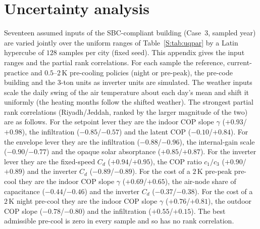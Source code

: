 \documentclass[10pt,a4paper,twocolumn]{article}
\theoremstyle{definition}
\begin{document}
\section{Uncertainty analysis}\label{S:uq}\label{app:S7}
Seventeen assumed inputs of the SBC-compliant building (Case~3, sampled year) are varied jointly over the uniform ranges of Table~\ref{S:tab:uqpar} by a Latin hypercube of $128$ samples per city (fixed seed). This appendix gives the input ranges and the partial rank correlations. For each sample the reference, current-practice and $0.5$--$2\,$K pre-cooling policies (night or pre-peak), the pre-code building and the 3-ton units as inverter units are simulated. The weather inputs scale the daily swing of the air temperature about each day's mean and shift it uniformly (the heating months follow the shifted weather). The strongest partial rank correlations (Riyadh/Jeddah, ranked by the larger magnitude of the two) are as follows. For the setpoint lever they are the indoor COP slope $\gamma$ ($+0.93$/$+0.98$), the infiltration ($-0.85$/$-0.57$) and the latent COP ($-0.10$/$+0.84$). For the envelope lever they are the infiltration ($-0.88$/$-0.96$), the internal-gain scale ($-0.90$/$-0.77$) and the opaque solar absorptance ($+0.85$/$+0.87$). For the inverter lever they are the fixed-speed $C_d$ ($+0.94$/$+0.95$), the COP ratio $c_1/c_3$ ($+0.90$/$+0.89$) and the inverter $C_d$ ($-0.89$/$-0.89$). For the cost of a $2\,$K pre-peak pre-cool they are the indoor COP slope $\gamma$ ($+0.69$/$+0.65$), the air-node share of capacitance ($-0.44$/$-0.46$) and the inverter $C_d$ ($-0.37$/$-0.38$). For the cost of a $2\,$K night pre-cool they are the indoor COP slope $\gamma$ ($+0.76$/$+0.81$), the outdoor COP slope ($-0.78$/$-0.80$) and the infiltration ($+0.55$/$+0.15$). The best admissible pre-cool is zero in every sample and so has no rank correlation.
\end{document}
